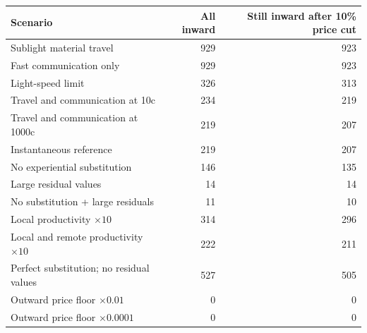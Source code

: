 \begin{tabularx}{\textwidth}{@{}Xrr@{}}
\toprule
Scenario & All inward & Still inward after 10\% price cut \\
\midrule
Sublight material travel & 929 & 923 \\
Fast communication only & 929 & 923 \\
Light-speed limit & 326 & 313 \\
Travel and communication at 10c & 234 & 219 \\
Travel and communication at 1000c & 219 & 207 \\
Instantaneous reference & 219 & 207 \\
No experiential substitution & 146 & 135 \\
Large residual values & 14 & 14 \\
No substitution + large residuals & 11 & 10 \\
Local productivity $\times10$ & 314 & 296 \\
Local and remote productivity $\times10$ & 222 & 211 \\
Perfect substitution; no residual values & 527 & 505 \\
Outward price floor $\times0.01$ & 0 & 0 \\
Outward price floor $\times0.0001$ & 0 & 0 \\
\bottomrule
\end{tabularx}
